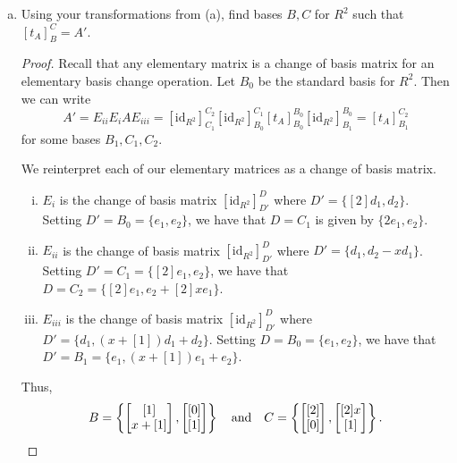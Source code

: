 \documentclass[11pt]{article}
\theoremstyle{definition}
\begin{document}
\begin{enumerate}[(a)]
\begin{proof}
We then have $A' = E_{ii} E_{i} A E_{iii}$, so we can take
\[ P = E_{ii} E_{i} = \begin{bmatrix} [2] & 0 \\ x & [1] \end{bmatrix}, \ \text{and} \ Q=E_{iii}.\qedhere\]
\end{proof}
\item Using your transformations from (a), find bases $B, C$ for $R^2$ such that $[t_A]_B^C = A'$.
\begin{proof}
Recall that any elementary matrix is a change of basis matrix for an elementary basis change operation. Let $B_0$ be the standard basis for $R^2$. Then we can write
\[ A' = E_{ii} E_i A E_{iii} = [\mathrm{id}_{R^2}]_{C_1}^{C_2} [\mathrm{id}_{R^2}]_{B_0}^{C_1} [t_A]_{B_0}^{B_0} [\mathrm{id}_{R^2}]^{B_0}_{B_1} = [t_A]_{B_1}^{C_2}\]
for some bases $B_1,C_1,C_2$.

We reinterpret each of our elementary matrices as a change of basis matrix. 
\begin{enumerate}[(i)]
\item  $E_i$ is the change of basis matrix $[\mathrm{id}_{R^2}]_{D'}^D$ where $D'=\{[2] d_1, d_2\}$. Setting $D'=B_0= \{e_1,e_2\}$, we have that $D=C_1$ is given by $\{2e_1,e_2\}$.
\item $E_{ii}$ is the change of basis matrix $[\mathrm{id}_{R^2}]_{D'}^D$ where $D'=\{d_1, d_2 -x d_1\}$. Setting $D'=C_1 = \{[2]e_1,e_2\}$, we have that $D=C_2 = \{[2]e_1, e_2 + [2]x e_1\}$.
\item $E_{iii}$ is the change of basis matrix $[\mathrm{id}_{R^2}]_{D'}^D$ where $D'=\{d_1, (x+[1])d_1 + d_2\}$. Setting $D=B_0 = \{e_1, e_2\}$, we have that $D'=B_1=\{ e_1 , (x+[1]) e_1 + e_2\}$. 
\end{enumerate}
Thus, 
\[ B = \left\{ \begin{bmatrix} [1] \\ x+[1] \end{bmatrix} , \begin{bmatrix} [0] \\ [1] \end{bmatrix}\right\} \quad \text{and} \quad C= \left\{ \begin{bmatrix} [2] \\ [0] \end{bmatrix} , \begin{bmatrix} [2]x \\ [1] \end{bmatrix}\right\}.\qedhere\]
\end{proof}
\end{enumerate}
\end{document}
